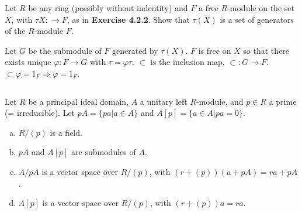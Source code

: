 $$ $$

\begin{ex}
    Let $R$ be any ring (possibly without indentity) and $F$ a free $R$-module on the set $X$, with $\tau X:\to F$, as in \textbf{Exercise 4.2.2}. Show that $\tau(X)$ is a set of generators of the $R$-module $F$.
\end{ex}

\begin{answer}
    Let $G$ be the submodule of $F$ generated by $\tau(X)$. $F$ is free on $X$ so that there exists unique $\varphi:F\to G$ with $\tau=\varphi\tau$. $\subset$ is the inclusion map, $\subset:G\to F$. $\subset\varphi=1_{F}\Rightarrow \varphi=1_{F}$.

    \begin{figure}[H]\centering
    \end{figure}
\end{answer}

$$ $$

\begin{ex}
    Let $R$ be a principal ideal domain, $A$ a unitary left $R$-module, and $p\in R$ a prime (= irreducible). Let $pA=\{pa|a\in A\}$ and $A[p]=\{a\in A|pa=0\}$.
    \begin{enumerate}[(a)]
        \item $R/(p)$ is a field.
        \item $pA$ and $A[p]$ are submodules of $A$.
        \item $A /pA$ is a vector space over $R /(p)$, with $(r+(p))(a+pA)=ra+pA$.
        \item $A[p]$ is a vector space over $R /(p)$, with $(r+(p))a=ra$.
    \end{enumerate}
\end{ex}


